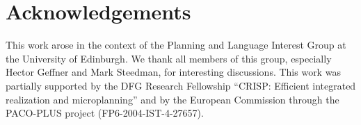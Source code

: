 \section{Acknowledgements}
This work arose in the context of the Planning and Language Interest Group
at the University of Edinburgh. We thank all members of this group,
especially Hector Geffner and Mark Steedman, for interesting discussions.
This work was partially supported by the DFG Research Fellowship ``CRISP:
Efficient integrated realization and microplanning'' and by the European
Commission through the PACO-PLUS project (FP6-2004-IST-4-27657).


